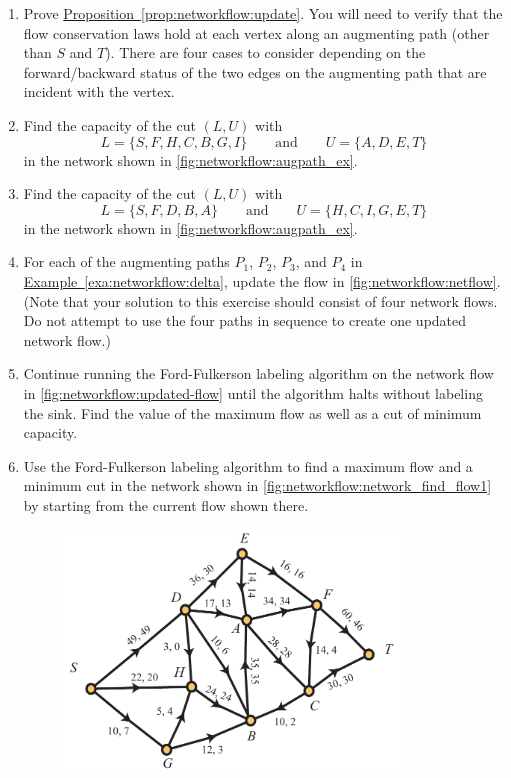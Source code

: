 \begin{enumerate}
\item Prove
  \hyperref[prop:networkflow:update]{Proposition~\ref*{prop:networkflow:update}}. You
  will need to verify that the flow conservation laws hold at each
  vertex along an augmenting path (other than $S$ and $T$). There are
  four cases to consider depending on the forward/backward status of
  the two edges on the augmenting path that are incident with the
  vertex.\label{ex:networkflow:update}
\item Find the capacity of the cut $(L,U)$ with
  \[L=\{S,F,H,C,B,G,I\}\qquad\text{and}\qquad U=\{A,D,E,T\}\]
  in the network shown in \autoref{fig:networkflow:augpath_ex}.
\item Find the capacity of the cut $(L,U)$ with
  \[L=\{S,F,D,B,A\}\qquad\text{and}\qquad U=\{H,C,I,G,E,T\}\]
  in the network shown in \autoref{fig:networkflow:augpath_ex}.
\item For each of the augmenting paths $P_1$, $P_2$, $P_3$, and $P_4$
  in
  \hyperref[exa:networkflow:delta]{Example~\ref*{exa:networkflow:delta}},
  update the flow in \autoref{fig:networkflow:netflow}. (Note that
  your solution to this exercise should consist of four network
  flows. Do not attempt to use the four paths in sequence to create
  one updated network flow.) \label{ex:networkflow:do-update}
\item Continue running the Ford-Fulkerson labeling algorithm on the
  network flow in \autoref{fig:networkflow:updated-flow} until the
  algorithm halts without labeling the sink. Find the value of the
  maximum flow as well as a cut of minimum capacity.
\item Use the Ford-Fulkerson labeling algorithm to find a maximum flow
  and a minimum cut in the network shown in
  \autoref{fig:networkflow:network_find_flow1} by starting from the
  current flow shown there.
  \begin{figure}
    \centering
    \includegraphics[width=3.5in]{networkflow-figs/network_find_flow1}

\end{figure}
\end{enumerate}
